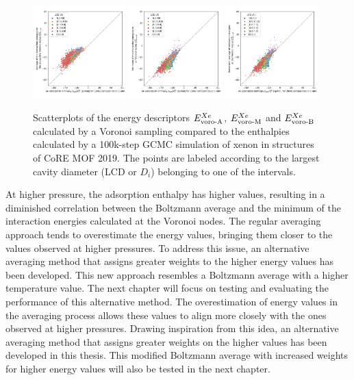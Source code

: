 \documentclass[main]{subfiles}
\begin{document}
\begin{figure}[ht]
    \centering
      \includegraphics[width=0.32\textwidth]{figures/3-fastsim/H_Xe_2080_vs_E_voro_A_overview.jpg}
      \hfill
      \includegraphics[width=0.32\textwidth]{figures/3-fastsim/H_Xe_2080_vs_E_voro_M_overview.jpg}
      \hfill
      \includegraphics[width=0.32\textwidth]{figures/3-fastsim/H_Xe_2080_vs_E_voro_B_overview.jpg}
      \caption{Scatterplots of the energy descriptors $E_{\text{voro-A}}^{Xe}$, $E_{\text{voro-M}}^{Xe}$ and $E_{\text{voro-B}}^{Xe}$ calculated by a Voronoi sampling compared to the enthalpies calculated by a 100k-step GCMC simulation of xenon in structures of CoRE MOF 2019. The points are labeled according to the largest cavity diameter (LCD or $D_i$) belonging to one of the intervals.}\label{fgr:compa_voro_2080}
  \end{figure}
  
At higher pressure, the adsorption enthalpy has higher values, resulting in a diminished correlation between the Boltzmann average and the minimum of the interaction energies calculated at the Voronoi nodes. The regular averaging approach tends to overestimate the energy values, bringing them closer to the values observed at higher pressures. To address this issue, an alternative averaging method that assigns greater weights to the higher energy values has been developed. This new approach resembles a Boltzmann average with a higher temperature value. The next chapter will focus on testing and evaluating the performance of this alternative method. The overestimation of energy values in the averaging process allows these values to align more closely with the ones observed at higher pressures. Drawing inspiration from this idea, an alternative averaging method that assigns greater weights on the higher values has been developed in this thesis. This modified Boltzmann average with increased weights for higher energy values will also be tested in the next chapter.
\end{document}
